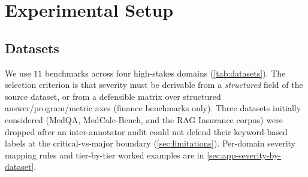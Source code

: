 \documentclass[11pt]{article}
\begin{document}
\section{Experimental Setup}
\label{sec:experiments}

\subsection{Datasets}
\label{sec:datasets}

We use $11$ benchmarks across four high-stakes domains
(\autoref{tab:datasets}). The selection criterion is that
severity must be derivable from a \emph{structured} field of the
source dataset, or from a defensible matrix over structured
answer/program/metric axes (finance benchmarks only). Three
datasets initially considered (MedQA, MedCalc-Bench, and the RAG
Insurance corpus) were dropped after an inter-annotator audit
could not defend their keyword-based labels at the
critical-vs-major boundary (\autoref{sec:limitations}). Per-domain
severity mapping rules and tier-by-tier worked examples are in
\autoref{sec:app-severity-by-dataset}.
\end{document}
